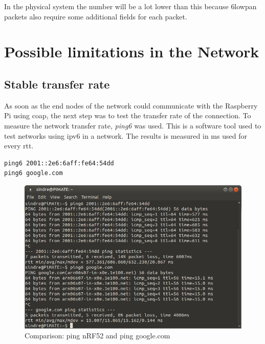 \noindent In the physical system the number will be a lot lower than this because \gls{6lowpan} packets also require some additional fields for each packet. 
 

\section{Possible limitations in the Network}

\subsection{Stable transfer rate}

As soon as the end nodes of the network could communicate with the Raspberry Pi using \gls{coap}, the next step was to test the transfer rate of the connection. To measure the network transfer rate, \textit{ping6} was used. This is a software tool used to test networks using \gls{ipv6} in a network. The results is measured in ms used for every \acrlong{rtt}. %

\begin{verbatim}
ping6 2001::2e6:6aff:fe64:54dd
ping6 google.com
\end{verbatim}

\begin{figure}[h!]
    \centering
    \includegraphics[width=1.0\textwidth]{ping6test.png}    
    \caption{Comparison: ping nRF52 and ping google.com}
    \label{fig:pingComparison}
\end{figure}

